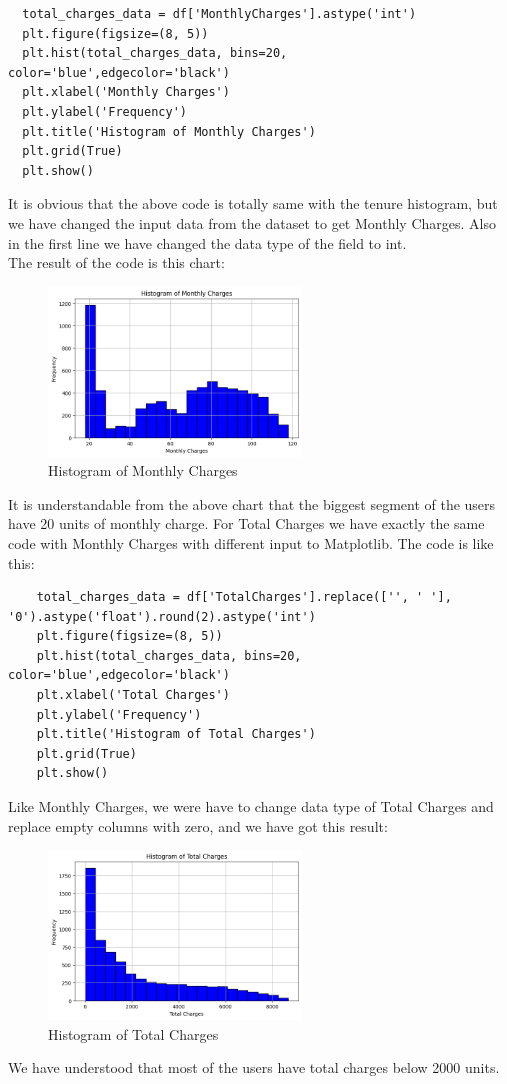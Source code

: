 \documentclass[12pt]{article}
\begin{document}
\begin{lstlisting}
  total_charges_data = df['MonthlyCharges'].astype('int')
  plt.figure(figsize=(8, 5))
  plt.hist(total_charges_data, bins=20, color='blue',edgecolor='black')
  plt.xlabel('Monthly Charges')
  plt.ylabel('Frequency')
  plt.title('Histogram of Monthly Charges')
  plt.grid(True)
  plt.show()
  \end{lstlisting}
  \vspace{\baselineskip}
  It is obvious that the above code is totally same with the tenure histogram, but we have changed the input data from the dataset to get Monthly Charges. Also in the first line we have changed the data type of the field to int.\\
  The result of the code is this chart:
  \begin{figure}[htbp]
    \centering
    \includegraphics[width=0.6\textwidth]{assets/hist_monthly_charges.png}
    \caption{Histogram of Monthly Charges}
  \end{figure}
  \vspace{\baselineskip}
  \newline
  It is understandable from the above chart that the biggest segment of the users have 20 units of monthly charge.
  \vspace{\baselineskip}
  \newline
  For Total Charges we have exactly the same code with Monthly Charges with different input to Matplotlib. The code is like this:
  \newpage
  \begin{lstlisting}
    total_charges_data = df['TotalCharges'].replace(['', ' '], '0').astype('float').round(2).astype('int')
    plt.figure(figsize=(8, 5))
    plt.hist(total_charges_data, bins=20, color='blue',edgecolor='black')
    plt.xlabel('Total Charges')
    plt.ylabel('Frequency')
    plt.title('Histogram of Total Charges')
    plt.grid(True)
    plt.show()
    \end{lstlisting}
    Like Monthly Charges, we were have to change data type of Total Charges and replace empty columns with zero, and we have got this result: 
    \begin{figure}[htbp]
      \centering
      \includegraphics[width=0.6\textwidth]{assets/hist_total_charges.png}
      \caption{Histogram of Total Charges}
    \end{figure}
    \vspace{\baselineskip}
    \newline
    We have understood that most of the users have total charges below 2000 units.
\end{document}

